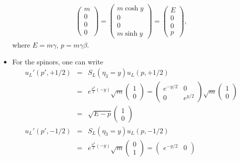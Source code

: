 \documentclass[11pt]{article}
\begin{document}
\begin{itemize}
\begin{eqnarray}
        \begin{pmatrix}
            m \\ 0 \\ 0 \\ 0
          \end{pmatrix}
        =
        \begin{pmatrix}
          m \cosh y \\ 0 \\ 0 \\ m \sinh y 
        \end{pmatrix}
        =
        \begin{pmatrix}
         E \\ 0 \\ 0 \\ p
        \end{pmatrix},
      \end{eqnarray}
    where $E=m\gamma$, $p=m \gamma \beta$.
    \item For the spinors, one can write
    \begin{eqnarray}
        u_L'(p',+1/2)
        &=& S_L(\eta_3=y) u_L(p,+1/2) \\
        &=& e^{ \frac{\sigma^3}{2} (-y) } \sqrt{m}
        \begin{pmatrix}
            1\\0
        \end{pmatrix}
        =
        \begin{pmatrix}
            e^{-y/2} & 0\\
            0 & e^{y/2}
        \end{pmatrix}
        \sqrt{m}
        \begin{pmatrix}
            1\\0
        \end{pmatrix}\\
        &=&\sqrt{E-p}   
        \begin{pmatrix}
          1\\0
        \end{pmatrix}\\
        u_L'(p',-1/2)
        &=& S_L(\eta_3=y) u_L(p,-1/2) \\
        &=& e^{ \frac{\sigma^3}{2} (-y) } \sqrt{m}
        \begin{pmatrix}
            0\\1
        \end{pmatrix}
        =
        \begin{pmatrix}
            e^{-y/2} & 0\\

\end{pmatrix}
\end{eqnarray}
\end{itemize}
\end{document}
